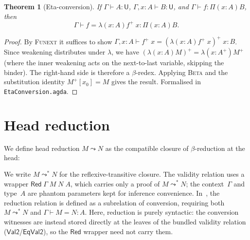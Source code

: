 \documentclass[11pt]{article}
\newcommand{\hastype}[3]{#1 \vdash #2 : #3}
\newcommand{\conveq}[4]{#1 \vdash #2 = #3 : #4}
\newcommand{\Pitype}[2]{\Pi(#1)#2}
\newcommand{\Lamterm}[2]{\lambda(#1)#2}
\newcommand{\App}[2]{#1\;#2}
\newcommand{\substone}[2]{#1[#2]}
\newcommand{\wkn}[1]{#1^+}
\newcommand{\U}{\mathsf{U}}
\newcommand{\Red}{\mathrel{\leadsto^*}}
\newtheorem{theorem}{Theorem}
\begin{document}
\begin{theorem}[Eta-conversion]
  If\/ $\hastype{\Gamma}{A}{\U}$, $\hastype{\Gamma, x{:}A}{B}{\U}$,
  and $\hastype{\Gamma}{f}{\Pitype{x{:}A}{B}}$, then
  \[
    \conveq{\Gamma}{f}{\Lamterm{x{:}A}{\App{\wkn{f}}{x}}}{\Pitype{x{:}A}{B}}.
  \]
\end{theorem}

\begin{proof}
  By \textsc{Funext} it suffices to show
  $\conveq{\Gamma, x{:}A}{\App{\wkn{f}}{x}}
    {\App{\wkn{(\Lamterm{x{:}A}{\App{\wkn{f}}{x}})}}{x}}{B}$.
  Since weakening distributes under $\lambda$, we have
  $\wkn{(\Lamterm{x{:}A}{M})} = \Lamterm{x{:}\wkn{A}}{\wkn{M}}$
  (where the inner weakening acts on the next-to-last variable,
  skipping the binder).  The right-hand side is therefore a
  $\beta$-redex.  Applying \textsc{Beta} and the substitution
  identity $\substone{\wkn{M}}{x_0} = M$ gives the result.
  Formalised in \texttt{EtaConversion.agda}.
\end{proof}

\section{Head reduction}

We define head reduction $M \leadsto N$ as the compatible closure
of $\beta$-reduction at the head:

We write $M \Red N$ for the reflexive-transitive closure.
The validity relation uses a wrapper $\mathsf{Red}\;\Gamma\;M\;N\;A$,
which carries only a proof of $M \Red N$; the context~$\Gamma$ and
type~$A$ are phantom parameters kept for inference convenience.
In~\cite{CH2018}, the reduction relation is defined as a subrelation
of conversion, requiring both $M \Red N$ and $\conveq{\Gamma}{M}{N}{A}$.
Here, reduction is purely syntactic: the conversion witnesses are
instead stored directly at the leaves of the bundled validity
relation ($\mathsf{Val2}$/$\mathsf{EqVal2}$), so the
$\mathsf{Red}$ wrapper need not carry them.

\end{document}
